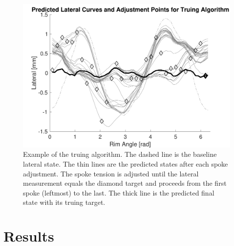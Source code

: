 \documentclass[journal]{IEEEtran}
\begin{document}
\begin{figure}[!t]
\centering
\includegraphics[width=3.5 in]{./figs/algo}
\caption{Example of the truing algorithm. The dashed line is the baseline lateral state.  The thin lines are the predicted states after each spoke adjustment. The spoke tension is adjusted until the lateral measurement equals the diamond target and proceeds from the first spoke (leftmost) to the last.  The thick line is the predicted final state with its truing target. }
\label{fig:algo}
\end{figure}

\section{Results}
\end{document}
